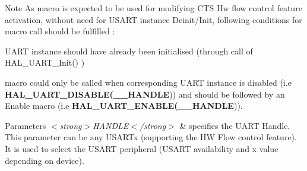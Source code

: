 \begin{DoxyNote}{Note}
As macro is expected to be used for modifying C\-T\-S Hw flow control feature activation, without need for U\-S\-A\-R\-T instance Deinit/\-Init, following conditions for macro call should be fulfilled \-:
\begin{DoxyItemize}
\item U\-A\-R\-T instance should have already been initialised (through call of H\-A\-L\-\_\-\-U\-A\-R\-T\-\_\-\-Init() )
\item macro could only be called when corresponding U\-A\-R\-T instance is disabled (i.\-e {\bfseries H\-A\-L\-\_\-\-U\-A\-R\-T\-\_\-\-D\-I\-S\-A\-B\-L\-E(\-\_\-\-\_\-\-H\-A\-N\-D\-L\-E})) and should be followed by an Enable macro (i.\-e {\bfseries H\-A\-L\-\_\-\-U\-A\-R\-T\-\_\-\-E\-N\-A\-B\-L\-E(\-\_\-\-\_\-\-H\-A\-N\-D\-L\-E})). 
\end{DoxyItemize}
\end{DoxyNote}

\begin{DoxyParams}{Parameters}
{\em $<$strong$>$\-H\-A\-N\-D\-L\-E$<$/strong$>$} & specifies the U\-A\-R\-T Handle. This parameter can be any U\-S\-A\-R\-Tx (supporting the H\-W Flow control feature). It is used to select the U\-S\-A\-R\-T peripheral (U\-S\-A\-R\-T availability and x value depending on device). \\
\hline
\end{DoxyParams}

